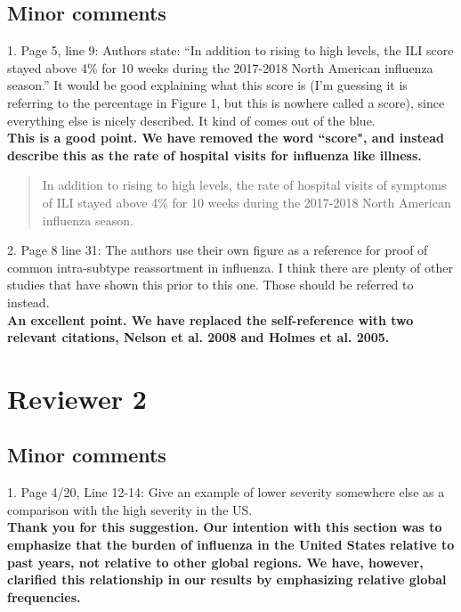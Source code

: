 \documentclass[11pt,oneside,letterpaper]{article}
\begin{document}
\subsection*{Minor comments}
1. Page 5, line 9: Authors state: “In addition to rising to high levels, the ILI score stayed above 4\% for 10 weeks during the 2017-2018 North American influenza season.” It would be good explaining what this score is (I’m guessing it is referring to the percentage in Figure 1, but this is nowhere called a score), since everything else is nicely described. It kind of comes out of the blue.\\

\textbf{This is a good point. We have removed the word ``score", and instead describe this as the rate of hospital visits for influenza like illness.}

\begin{quotation}
  In addition to rising to high levels, the rate of hospital visits of symptoms of ILI stayed above 4\% for 10 weeks during the 2017-2018 North American influenza season.
\end{quotation}

2. Page 8 line 31: The authors use their own figure as a reference for proof of common intra-subtype reassortment in influenza. I think there are plenty of other studies that have shown this prior to this one. Those should be referred to instead.\\

\textbf{An excellent point. We have replaced the self-reference with two relevant citations, Nelson et al. 2008 and Holmes et al. 2005.}

\section*{Reviewer 2}
\subsection*{Minor comments}
1. Page 4/20, Line 12-14: Give an example of lower severity somewhere else as a comparison with the high severity in the US.\\

\textbf{Thank you for this suggestion. Our intention with this section was to emphasize that the burden of influenza in the United States relative to past years, not relative to other global regions. We have, however, clarified this relationship in our results by emphasizing relative global frequencies.}
\end{document}
